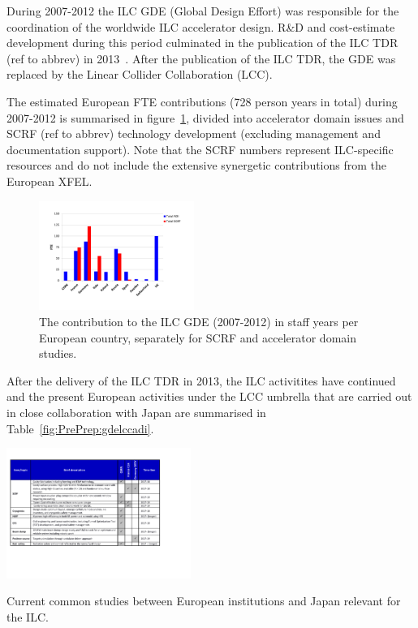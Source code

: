 \documentclass[%
 reprint,
 amsmath,amssymb,
 aps,
]{revtex4-1}
\begin{document}
During 2007-2012 the ILC GDE (Global Design Effort) was responsible for the coordination of the worldwide ILC accelerator design. R\&D and cost-estimate development during this period culminated in the publication of the ILC TDR (ref to abbrev) in 2013~\cite{ILC-TDR}. After the publication of the ILC TDR, the GDE was replaced by the Linear Collider Collaboration (LCC). 

The estimated European FTE contributions (728 person years in total) during 2007-2012 is summarised in figure~\ref{fig:PrePrep:ilcgde4}, 
divided into accelerator domain issues and SCRF (ref to abbrev) technology development (excluding management and documentation support). Note that the SCRF numbers represent ILC-specific resources and do not include the extensive synergetic contributions from the European XFEL.


\begin{figure}[htbp]
\includegraphics[width=0.45\textwidth]{figures/EU-GDE-FTE-columns-per-country.pdf}
\caption{\label{fig:PrePrep:ilcgde4} The contribution to the ILC GDE  (2007-2012) in staff years per European country, separately for SCRF and accelerator domain studies.}
\end{figure}

After the delivery of the ILC TDR in 2013, the ILC activitites have continued and the present European activities under the LCC umbrella that are carried out in close collaboration with Japan are summarised in Table~\ref{fig:PrePrep:gdelccadi}.

\begin{table}[htbp]
\includegraphics[width=0.45\textwidth]{figures/ILCEAP-Matrices-LCCADI.pdf}
\caption{\label{fig:PrePrep:gdelccadi} Current common studies between European institutions and Japan relevant for the ILC.}
\end{table}
\end{document}
